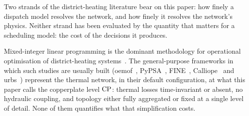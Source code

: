 
Two strands of the district-heating literature bear on this paper: how finely a
dispatch model resolves the network, and how finely it resolves the network's physics.
Neither strand has been evaluated by the quantity that matters for a scheduling model:
the cost of the decisions it produces.

Mixed-integer linear programming is the dominant methodology for operational
optimisation of district-heating systems~\cite{Fang2016}. The general-purpose
frameworks in which such studies are usually built (oemof~\cite{Hilpert2018_oemof},
PyPSA~\cite{Brown2018_pypsa}, FINE~\cite{Welder2018_FINE},
Calliope~\cite{Pfenninger2018_calliope} and urbs~\cite{Dorfner2016_urbs})
represent the thermal network, in their default configuration, at what this paper calls
the copperplate level $\mathrm{CP}$: thermal losses time-invariant or absent, no hydraulic
coupling, and topology either fully aggregated or fixed at a single level of detail.
None of them quantifies what that simplification costs.

